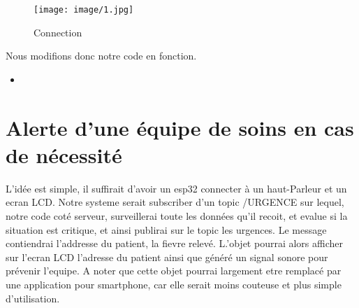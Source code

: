 \documentclass[10pt,a4paper]{article}
\newcommand{\insertcode}[2]{\begin{itemize}\item[]\end{itemize}}
\begin{document}
\begin{figure}[h!]
\centering
\texttt{[image: image/1.jpg]}
\caption{Connection }
\label{fig:net }
\end{figure}
\newpage
Nous modifions donc notre code en fonction.
\insertcode{code/2.ino}{code}\newpage

 
\section{Alerte d’une équipe de soins en cas de nécessité}
L'idée est simple, il suffirait d'avoir un esp32 connecter à un haut-Parleur et un ecran LCD. Notre systeme serait 
subscriber d'un topic /URGENCE sur lequel, notre code coté serveur, surveillerai toute les données qu'il recoit, et evalue si la situation est critique, et ainsi publirai sur le topic les urgences. Le message contiendrai l'addresse du patient, la fievre relevé. L.'objet pourrai alors afficher sur l'ecran LCD l'adresse du patient ainsi que généré un signal sonore pour prévenir l'equipe. A noter que cette objet pourrai largement etre remplacé par une application pour smartphone, car elle serait moins couteuse et plus simple d'utilisation.
\end{document}
